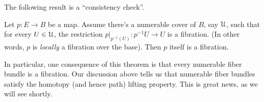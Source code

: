 The following result is a ``consistency check''.
\begin{theorem}[Dold]
    Let $p:E\to B$ be a map. Assume there's a numerable cover of $B$, say $\mathcal U$, such that for every $U\in\mathcal U$,
    the restriction $p|_{p^{-1}(U)}:p^{-1}U\to U$ is a fibration.
    (In other words, $p$ is \emph{locally} a fibration over the base).
    Then $p$ itself is a fibration.
\end{theorem}
In particular, one consequence of this theorem is that every numerable fiber bundle is a fibration.
Our discussion above tells us that numerable fiber bundles satisfy the homotopy (and hence path) lifting property.
This is great news, as we will see shortly.
